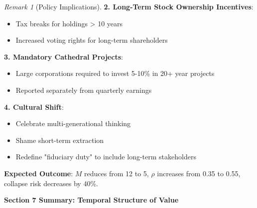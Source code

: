 \documentclass[11pt,a4paper]{article}
\theoremstyle{definition}
\theoremstyle{remark}
\newtheorem{remark}{Remark}[section]
\begin{document}
\begin{small}
\begin{enumerate}
\begin{remark}[Policy Implications]
\textbf{2. Long-Term Stock Ownership Incentives}:
\begin{itemize}
    \item Tax breaks for holdings > 10 years
    \item Increased voting rights for long-term shareholders
\end{itemize}

\textbf{3. Mandatory Cathedral Projects}:
\begin{itemize}
    \item Large corporations required to invest 5-10\% in 20+ year projects
    \item Reported separately from quarterly earnings
\end{itemize}

\textbf{4. Cultural Shift}:
\begin{itemize}
    \item Celebrate multi-generational thinking
    \item Shame short-term extraction
    \item Redefine "fiduciary duty" to include long-term stakeholders
\end{itemize}

\textbf{Expected Outcome}: \(M\) reduces from 12 to 5, \(\rho\) increases from 0.35 to 0.55, collapse risk decreases by 40\%.
\end{remark}

\begin{mdframed}[backgroundcolor=green!10,linewidth=2pt,linecolor=green!70!black]
\textbf{Section 7 Summary: Temporal Structure of Value}


\end{mdframed}
\end{enumerate}
\end{small}
\end{document}
